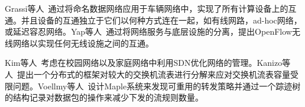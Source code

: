 
Grassi等人~\cite{grassi2014vanet}通过将命名数据网络应用于车辆网络中，实现了所有计算设备上的互通。并且设备的互通独立于它们以何种方式连在一起，如有线网路，ad-hoc网络，或延迟容忍网络。Yap等人~\cite{yap2010blueprint}通过将网络服务与底层设施的分离，提出OpenFlow无线网络以实现任何无线设施之间的互通。


Kim等人~\cite{kim2013improving}考虑在校园网络以及家庭网络中利用SDN优化网络的管理。Kanizo等人~\cite{kanizo2013palette}提出一个分布式的框架对较大的交换机流表进行分解来应对交换机流表容量受限问题。Voellmy等人~\cite{voellmy2013maple}设计Maple系统来发现可重用的转发策略并通过一个踪迹树的结构记录对数据包的操作来减少下发的流规则数量。


